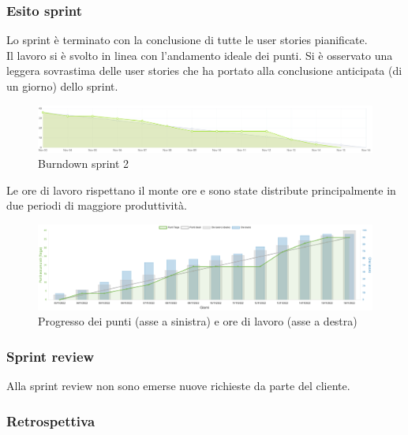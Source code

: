 \newpage
\subsubsection{Esito sprint}
Lo sprint è terminato con la conclusione di tutte le user stories pianificate.\\
Il lavoro si è svolto in linea con l'andamento ideale dei punti. 
Si è osservato una leggera sovrastima delle user stories che ha portato alla conclusione anticipata (di un giorno) dello sprint.\\
\begin{figure}[H]
    \centering
    \includegraphics[width=15cm]{./img/sprint2/burndown.png}
    \caption{Burndown sprint 2}
\end{figure}
Le ore di lavoro rispettano il monte ore e sono state distribute principalmente in due periodi di maggiore produttività.
\begin{figure}[H]
    \centering
    \includegraphics[width=15cm]{./img/sprint2/worktime.png}
    \caption{Progresso dei punti (asse a sinistra) e ore di lavoro (asse a destra)}
\end{figure}


\subsubsection{Sprint review}
Alla sprint review non sono emerse nuove richieste da parte del cliente.


\newpage
\subsubsection{Retrospettiva}
